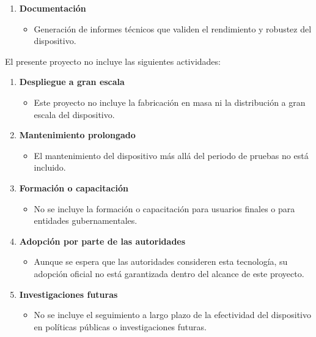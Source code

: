 \begin{enumerate}[label=\alph*)]
	\item \textbf{Documentación}
	\begin{itemize}
		\item Generación de informes técnicos que validen el rendimiento y robustez del dispositivo.
	\end{itemize}

\end{enumerate}

El presente proyecto no incluye las siguientes actividades:

\begin{enumerate}[label=\alph*)]

	\item \textbf{Despliegue a gran escala}
	\begin{itemize}
		\item Este proyecto no incluye la fabricación en masa ni la distribución a gran escala del dispositivo.
	\end{itemize}

	\item \textbf{Mantenimiento prolongado}
	\begin{itemize}
		\item El mantenimiento del dispositivo más allá del periodo de pruebas no está incluido.
	\end{itemize}

	\item \textbf{Formación o capacitación}
	\begin{itemize}
		\item No se incluye la formación o capacitación para usuarios finales o para entidades gubernamentales.
	\end{itemize}

	\item \textbf{Adopción por parte de las autoridades}
	\begin{itemize}
		\item Aunque se espera que las autoridades consideren esta tecnología, su adopción oficial no está garantizada dentro del alcance de este proyecto.
	\end{itemize}

	\item \textbf{Investigaciones futuras}
	\begin{itemize}
		\item No se incluye el seguimiento a largo plazo de la efectividad del dispositivo en políticas públicas o investigaciones futuras.
	\end{itemize}

\end{enumerate}
